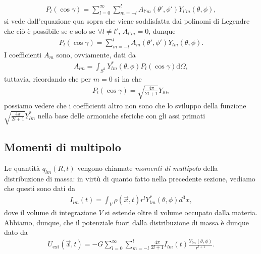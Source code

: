 \begin{align}
	P_l(\cos{\gamma}) = \sum_{l=0}^\infty \sum_{m=-l}^l A_{l' m}(\theta', \phi') Y_{l'm}(\theta, \phi),
\end{align}
si vede dall'equazione qua sopra che viene soddisfatta dai polinomi di Legendre che ciò è possibile se e solo se $\forall l \neq l'$, $A_{l'm} = 0$, dunque
\begin{align}
	P_l(\cos{\gamma}) = \sum_{m=-l}^l A_m(\theta', \phi') Y_{lm}(\theta, \phi).
\end{align}
I coefficienti $A_m$ sono, ovviamente, dati da
\begin{align}
	A_{lm} = \int_{S^2} Y^*_{lm}(\theta, \phi) P_l(\cos{\gamma}) \mathrm{d}\Omega,
\end{align}
tuttavia, ricordando che per $m=0$ si ha che
\begin{align}
	P_l(\cos{\gamma}) = \sqrt{\frac{4\pi}{2l+1}} Y_{l0},
\end{align}
possiamo vedere che i coefficienti altro non sono che lo sviluppo della funzione $\sqrt{\frac{4\pi}{2l+1}} Y_{lm}^*$ nella base delle armoniche sferiche con gli assi primati

\subsection{Momenti di multipolo}

Le quantità $q_{lm}(R,t)$ vengono chiamate \emph{momenti di multipolo} della distribuzione di massa: in virtù di quanto fatto nella precedente sezione, vediamo che questi sono dati da
\begin{align}
	I_{lm}(t) = \int_V \rho(\vec{x}, t) r^l Y_{lm}^*(\theta, \phi) d^3 x, 
\end{align}
dove il volume di integrazione $V$ si estende oltre il volume occupato dalla materia. Abbiamo, dunque, che il potenziale fuori dalla distribuzione di massa è dunque dato da
\begin{align}
	U_{\text{ext}}(\vec{x}, t) = -G \sum_{l=0}^\infty \sum_{m=-l}^l \frac{4 \pi}{2l + 1} I_{lm}(t) \frac{Y_{lm}(\theta, \phi)}{r^{l+1}}.
\end{align}

